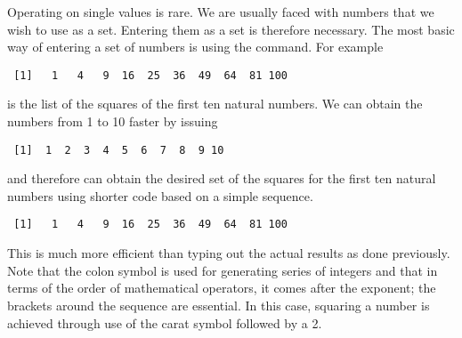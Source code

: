 Operating on single values is rare. We are usually faced with numbers that we wish to use as a set. Entering them as a set is therefore necessary. The most basic way of entering a set of numbers is using the  command. For example 
\begin{knitrout}
\color{fgcolor}\begin{kframe}
\begin{alltt}
\hlstd{> }\hlkwb{=}\hlstd{(}\hlstd{,} \hlstd{,} \hlstd{,} \hlstd{,} \hlstd{,} \hlstd{,} \hlstd{,} \hlstd{,} \hlstd{,} \hlstd{)}
\hlstd{> }
\end{alltt}
\begin{verbatim}
 [1]   1   4   9  16  25  36  49  64  81 100
\end{verbatim}
\end{kframe}
\end{knitrout}
is the list of the squares of the first ten natural numbers. We can obtain the numbers from 1 to 10 faster by issuing 
\begin{knitrout}
\color{fgcolor}\begin{kframe}
\begin{alltt}
\hlstd{> }\hlkwb{=}\hlopt{:}
\hlstd{> }
\end{alltt}
\begin{verbatim}
 [1]  1  2  3  4  5  6  7  8  9 10
\end{verbatim}
\end{kframe}
\end{knitrout}
and therefore can obtain the desired set of the squares for the first ten natural numbers using shorter code based on a simple sequence. 
\begin{knitrout}
\color{fgcolor}\begin{kframe}
\begin{alltt}
\hlstd{> }\hlkwb{=}\hlstd{(}\hlopt{:}\hlstd{)}\hlopt{^}
\hlstd{> }
\end{alltt}
\begin{verbatim}
 [1]   1   4   9  16  25  36  49  64  81 100
\end{verbatim}
\end{kframe}
\end{knitrout}
This is much more efficient than typing out the actual results as done previously. Note that the colon symbol is used for generating series of integers and that in terms of the order of mathematical operators, it comes after the exponent; the brackets around the sequence are essential. In this case, squaring a number is achieved through use of the carat symbol followed by a 2.  
 

